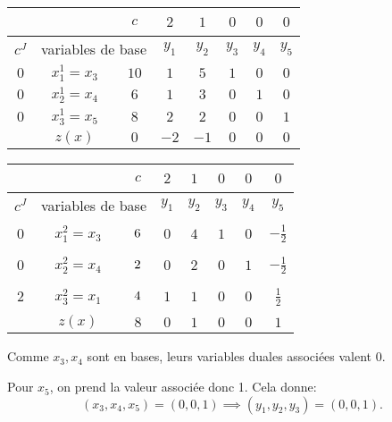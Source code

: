 {\begin{td-sol}[]
\begin{enumerate}
			\begin{center}
				\begin{tabular}{|ccc|ccccc|} %
					\hline  %
					\, & \, &\(c\)&\(2\)&\(1\)&\(0\)&\(0\)&\(0\)\\
					\hline %
					\multicolumn{1}{|c|}{\(c^J\)}& \multicolumn{2}{c|}{variables de base}&\(y_1\)&\(y_2\)&\(y_3\)&\(y_4\)&\(y_5\)\\
					\hline %
					\multicolumn{1}{|c|}{\(0\)}& \multicolumn{1}{c|}{\(x_1^{1}=x_3\)} &\(10\)&\(1\)&\(5\)&\(1\)&\(0\)&\(0\)\\
					\hline %
					\multicolumn{1}{|c|}{\(0\)}& \multicolumn{1}{c|}{\(x_2^{1}=x_4\)} &\(6\)&\(1\)&\(3\)&\(0\)&\(1\)&\(0\)\\
					\hline %
					\multicolumn{1}{|c|}{\(0\)}& \multicolumn{1}{c|}{\(x_3^{1}=x_5\)} &\(8\)&\(2\)&\(2\)&\(0\)&\(0\)&\(1\)\\
					\hline %
					\multicolumn{1}{|c|}{} &\(z(x)\)& \multicolumn{1}{|c|}{\(0\)} &\(-2\)&\(-1\)&\(0\)&\(0\)&\(0\)\\
					\hline %
				\end{tabular}
			\end{center}
			\becomes{}
			\begin{center}
				\begin{tabular}{|ccc|ccccc|} %
					\hline  %
					\, & \, &\(c\)&\(2\)&\(1\)&\(0\)&\(0\)&\(0\)\\
					\hline %
					\multicolumn{1}{|c|}{\(c^J\)}& \multicolumn{2}{c|}{variables de base}&\(y_1\)&\(y_2\)&\(y_3\)&\(y_4\)&\(y_5\)\\
					\hline %
					\multicolumn{1}{|c|}{\(0\)}& \multicolumn{1}{c|}{\(x_1^{2}=x_3\)} &\(\vphantom{\dfrac16}6\)&\(0\)&\(4\)&\(1\)&\(0\)&\(-\frac12\)\\
					\hline %
					\multicolumn{1}{|c|}{\(0\)}& \multicolumn{1}{c|}{\(x_2^{2}=x_4\)} &\(\vphantom{\dfrac16}2\)&\(0\)&\(2\)&\(0\)&\(1\)&\(-\frac12\)\\
					\hline %
					\multicolumn{1}{|c|}{\(2\)}& \multicolumn{1}{c|}{\(x_3^{2}=x_1\)} &\(\vphantom{\dfrac16}4\)&\(1\)&\(1\)&\(0\)&\(0\)&\(\frac12\)\\
					\hline %
					\multicolumn{1}{|c|}{} &\(z(x)\)& \multicolumn{1}{|c|}{\(8\)} &\(0\)&\(1\)&\(0\)&\(0\)&\(1\)\\
					\hline %
				\end{tabular}
			\end{center}

			Comme \(x_3,x_4\) sont en bases, leurs variables duales associées valent 0.

			Pour \(x_5\), on prend la valeur associée donc 1. Cela donne:
			\begin{equation*}
				(x_3,x_4,x_5) = (0, 0, 1) \implies (y_1,y_2,y_3) = (0, 0, 1).
			\end{equation*}
		\end{enumerate}
	\end{td-sol}
}{}


